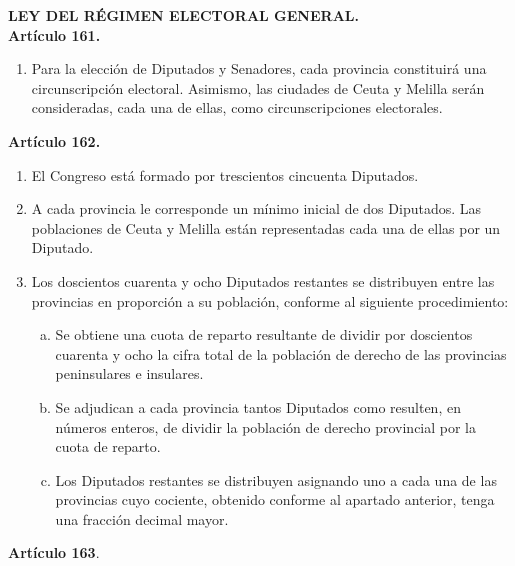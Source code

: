 \documentclass[11pt]{article}
\newcommand\console[1]{{\inconsolata #1}}
\begin{document}
	\console{
	\begin{leftbar}
		\textbf{LEY DEL RÉGIMEN ELECTORAL GENERAL.} \\
		\textbf{Artículo 161.}
		
		\begin{enumerate}
			\item Para la elección de Diputados y Senadores, cada provincia constituirá una circunscripción electoral. Asimismo, las ciudades de Ceuta y Melilla serán consideradas, cada una de ellas, como circunscripciones electorales.
		\end{enumerate}
		
		\textbf{Artículo 162.}
		
		\begin{enumerate}
			\item El Congreso está formado por trescientos cincuenta Diputados.
			\item A cada provincia le corresponde un mínimo inicial de dos Diputados. Las poblaciones de Ceuta y Melilla están representadas cada una de ellas por un Diputado.
			\item Los doscientos cuarenta y ocho Diputados restantes se distribuyen entre las provincias en proporción a su población, conforme al siguiente procedimiento:
				\begin{enumerate}[a)]
					\item Se obtiene una cuota de reparto resultante de dividir por doscientos cuarenta y ocho la cifra total de la población de derecho de las provincias peninsulares e insulares.
					\item Se adjudican a cada provincia tantos Diputados como resulten, en números enteros, de dividir la población de derecho provincial por la cuota de reparto.
					\item Los Diputados restantes se distribuyen asignando uno a cada una de las provincias cuyo cociente, obtenido conforme al apartado anterior, tenga una fracción decimal mayor.
				\end{enumerate}
		\end{enumerate}
		
		\textbf{Artículo 163}.
	

\end{leftbar}}
\end{document}
